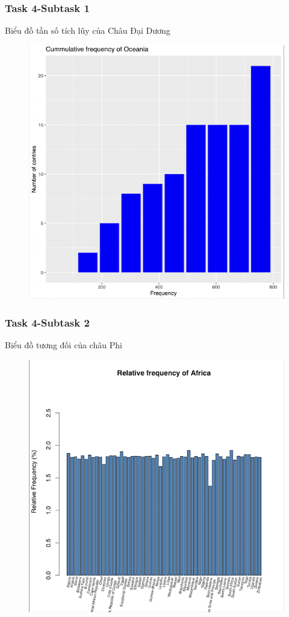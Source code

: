 \documentclass[english,10pt,table]{beamer}
\begin{document}
{
    \frametitle{Task 4-Subtask 1}
    \begin{block}{Biểu đồ tần số tích lũy của Châu Đại Dương}
    \begin{figure}
        \centering
        \includegraphics[scale=0.6]{images/4.1.6.png}
    \end{figure}
    \end{block}
}
\frame
{
    \frametitle{Task 4-Subtask 2}
    \begin{block}{Biểu đồ tương đối của châu Phi}
    \begin{figure}
        \centering
        \includegraphics[scale=0.5]{images/4.2.1.png}
    \end{figure}
    \end{block}
}
\end{document}

